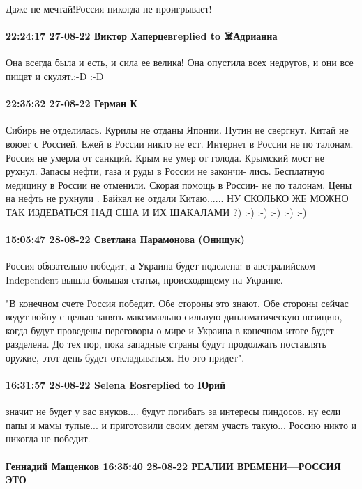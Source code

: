 Даже не мечтай!Россия никогда не проигрывает!

\paragraph{22:24:17 27-08-22 Виктор Хаперцевreplied to ☠️Адрианна}

Она всегда была и есть, и сила ее велика! Она опустила всех недругов, и они все
пищат и скулят.:-D :-D

\paragraph{22:35:32 27-08-22 Герман К}

Сибирь не отделилась. Курилы не отданы Японии. Путин не свергнут. Китай не воюет
с Россией. Ежей в России никто не ест. Интернет в России не по талонам. Россия
не умерла от санкций. Крым не умер от голода. Крымский мост не рухнул. Запасы нефти, газа и руды в России не закончи- лись. Бесплатную медицину в России не отменили. Скорая помощь в России- не по талонам. Цены на нефть не рухнули . Байкал не отдали Китаю......
НУ СКОЛЬКО ЖЕ МОЖНО ТАК ИЗДЕВАТЬСЯ НАД США И ИХ ШАКАЛАМИ ?) :-) :-) :-) :-) :-)

\paragraph{15:05:47 28-08-22 Светлана Парамонова (Онищук)}

Россия обязательно победит, а Украина будет поделена: в австралийском
Independent вышла большая статья, происходящему на Украине.

"В конечном счете Россия победит. Обе стороны это знают. Обе стороны сейчас
ведут войну с целью занять максимально сильную дипломатическую позицию, когда
будут проведены переговоры о мире и Украина в конечном итоге будет разделена.
До тех пор, пока западные страны будут продолжать поставлять оружие, этот день
будет откладываться. Но это придет".


\paragraph{16:31:57 28-08-22 Selena Eosreplied to Юрий}

значит не будет у вас внуков.... будут погибать за интересы пиндосов. ну если
папы и мамы тупые... и приготовили своим детям участь такую... Россию никто и
никогда не победит.


\paragraph{Геннадий Мащенков 16:35:40 28-08-22 РЕАЛИИ ВРЕМЕНИ---РОССИЯ ЭТО }

